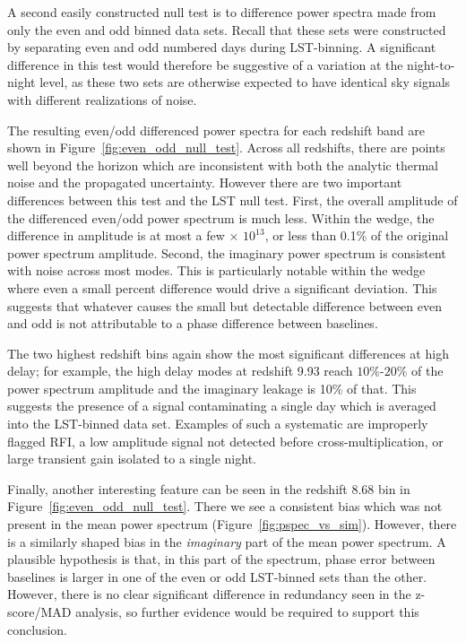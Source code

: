 A second easily constructed null test is to difference
power spectra made from only the even and odd binned data sets.
Recall that these sets were constructed by separating even and odd
numbered days during LST-binning. A significant difference in this test would therefore be suggestive of
a variation at the night-to-night level,
as these two sets are otherwise
expected to have identical sky signals
with different realizations of noise.

The resulting even/odd differenced power spectra for each redshift band
are shown in Figure~\ref{fig:even_odd_null_test}.
Across all redshifts, there are points well beyond the
horizon which are inconsistent with both the analytic thermal noise
and the propagated uncertainty. However there are two important differences
between this test and the LST null test. First, the overall amplitude of the differenced even/odd power spectrum is much less. Within the wedge, the
difference in amplitude is at most a few $\times$ $10^{13}$, or less than 0.1\% of the original power spectrum amplitude.
Second, the imaginary power spectrum is consistent with
noise across most modes. This is particularly notable within the wedge where even a small percent difference would drive a significant deviation. This
 suggests that whatever causes the small but detectable difference between
 even and odd is not attributable to a phase difference between baselines.

The two highest redshift
bins again show the most significant differences at high delay; for example, the high delay modes at redshift 9.93 reach $ 10\%$-$20\% $ of the power spectrum amplitude and the imaginary leakage is 10\% of that. This suggests the presence of a signal contaminating a single day which is averaged into the LST-binned data set.
Examples of such a systematic are improperly flagged RFI, a low amplitude signal not detected before cross-multiplication, or large transient gain isolated to a single night.

Finally, another interesting feature can be seen in the redshift 8.68 bin in Figure~\ref{fig:even_odd_null_test}.
There we see a consistent bias which was not present in the mean power spectrum (Figure~\ref{fig:pspec_vs_sim}).  However, there is a similarly shaped bias in the \emph{imaginary} part of the mean power spectrum. A plausible hypothesis
is that, in this part of the spectrum, phase error between baselines is larger in one of the even or odd LST-binned sets than the other. However, there is no clear significant difference in redundancy seen in the z-score/MAD analysis, so further evidence would be required to support this conclusion.

